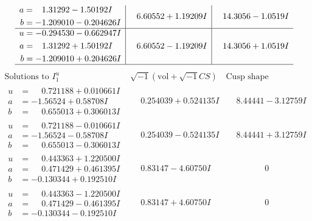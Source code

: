 \documentclass[1p]{elsarticle_modified}
\theoremstyle{definition}
\newcommand{\I}{\sqrt{-1}}
\begin{document}
$$\begin{array}{c|c|c}
\begin{aligned}
a &= \phantom{-}1.31292 - 1.50192 I \\
b &= -1.209010 - 0.204626 I\end{aligned}
 & \phantom{-}6.60552 + 1.19209 I & \phantom{-}14.3056 - 1.0519 I \\ \hline\begin{aligned}
u &= -0.294530 - 0.662947 I \\
a &= \phantom{-}1.31292 + 1.50192 I \\
b &= -1.209010 + 0.204626 I\end{aligned}
 & \phantom{-}6.60552 - 1.19209 I & \phantom{-}14.3056 + 1.0519 I\\
 \hline 
 \end{array}$$\newpage$$\begin{array}{c|c|c}  
\text{Solutions to }I^u_{1}& \I (\text{vol} + \sqrt{-1}CS) & \text{Cusp shape}\\
 \hline 
\begin{aligned}
u &= \phantom{-}0.721188 + 0.010661 I \\
a &= -1.56524 + 0.58708 I \\
b &= \phantom{-}0.655013 + 0.306013 I\end{aligned}
 & \phantom{-}0.254039 + 0.524135 I & \phantom{-}8.44441 - 3.12759 I \\ \hline\begin{aligned}
u &= \phantom{-}0.721188 - 0.010661 I \\
a &= -1.56524 - 0.58708 I \\
b &= \phantom{-}0.655013 - 0.306013 I\end{aligned}
 & \phantom{-}0.254039 - 0.524135 I & \phantom{-}8.44441 + 3.12759 I \\ \hline\begin{aligned}
u &= \phantom{-}0.443363 + 1.220500 I \\
a &= \phantom{-}0.471429 + 0.461395 I \\
b &= -0.130344 + 0.192510 I\end{aligned}
 & \phantom{-}0.83147 - 4.60750 I & \phantom{-0.000000 } 0 \\ \hline\begin{aligned}
u &= \phantom{-}0.443363 - 1.220500 I \\
a &= \phantom{-}0.471429 - 0.461395 I \\
b &= -0.130344 - 0.192510 I\end{aligned}
 & \phantom{-}0.83147 + 4.60750 I & \phantom{-0.000000 } 0 \\ \hline\begin{aligned}

\end{aligned}
\end{array}$$
\end{document}
